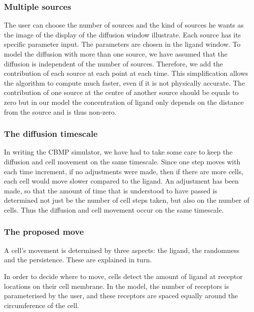 \documentclass[11.5pt]{article}
\begin{document}
\subsubsection{Multiple sources}
The user can choose the number of sources and the kind of sources he 
wants as the image of the display of the diffusion window illustrate. 
Each source has its specific parameter input. The parameters are chosen 
in the ligand window. To model the diffusion with more than one source, 
we have assumed that the diffusion is independent of the number of 
sources. Therefore, we add the contribution of each source at each point 
at each time. This simplification allows the algorithm to compute much 
faster, even if it is not physically accurate. The contribution of one 
source at the centre of another source should be equals to zero but in 
our model the concentration of ligand only depends on the distance from 
the source and is thus non-zero. 



\subsubsection{The diffusion timescale}


In writing the CBMP simulator, we have had to take some care to keep the 
diffusion and cell movement on the same timescale. Since one step moves 
with each time increment, if no adjustments were made, then if there are 
more cells, each cell would move slower compared to the ligand. An 
adjustment has been made, so that the amount of time that is understood 
to have passed is determined not just be the number of cell steps taken, 
but also on the number of cells. Thus the diffusion and cell movement 
occur on the same timescale.



\subsubsection{The proposed move}
A cell's movement is determined by three aspects: the ligand, the 
randomness and the persistence. These are explained in turn.



In order to decide where to move, cells detect the amount of ligand at 
receptor locations on their cell membrane. In the model, the number of 
receptors is parameterised by the user, and these receptors are spaced 
equally around the circumference of the cell. 
\end{document}
